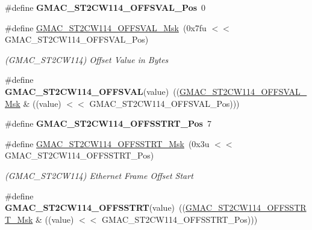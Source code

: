 \begin{DoxyCompactItemize}
\item 
\mbox{\label{group__SAME70__GMAC_ga6c2abe9d96e3e202f010911c71a17f2d}} 
\#define {\bfseries G\+M\+A\+C\+\_\+\+S\+T2\+C\+W114\+\_\+\+O\+F\+F\+S\+V\+A\+L\+\_\+\+Pos}~0
\item 
\mbox{\label{group__SAME70__GMAC_ga2ffa03caa370aef57a44a86255c453f7}} 
\#define \mbox{\hyperlink{group__SAME70__GMAC_ga2ffa03caa370aef57a44a86255c453f7}{G\+M\+A\+C\+\_\+\+S\+T2\+C\+W114\+\_\+\+O\+F\+F\+S\+V\+A\+L\+\_\+\+Msk}}~(0x7fu $<$$<$ G\+M\+A\+C\+\_\+\+S\+T2\+C\+W114\+\_\+\+O\+F\+F\+S\+V\+A\+L\+\_\+\+Pos)
\begin{DoxyCompactList}\small\item\em (G\+M\+A\+C\+\_\+\+S\+T2\+C\+W114) Offset Value in Bytes \end{DoxyCompactList}\item 
\mbox{\label{group__SAME70__GMAC_gabd4720e1e0ab74092611717ff3c27256}} 
\#define {\bfseries G\+M\+A\+C\+\_\+\+S\+T2\+C\+W114\+\_\+\+O\+F\+F\+S\+V\+AL}(value)~((\mbox{\hyperlink{group__SAMV71__GMAC_ga2ffa03caa370aef57a44a86255c453f7}{G\+M\+A\+C\+\_\+\+S\+T2\+C\+W114\+\_\+\+O\+F\+F\+S\+V\+A\+L\+\_\+\+Msk}} \& ((value) $<$$<$ G\+M\+A\+C\+\_\+\+S\+T2\+C\+W114\+\_\+\+O\+F\+F\+S\+V\+A\+L\+\_\+\+Pos)))
\item 
\mbox{\label{group__SAME70__GMAC_gad5eabe8a76317266e2fca53037591c58}} 
\#define {\bfseries G\+M\+A\+C\+\_\+\+S\+T2\+C\+W114\+\_\+\+O\+F\+F\+S\+S\+T\+R\+T\+\_\+\+Pos}~7
\item 
\mbox{\label{group__SAME70__GMAC_ga0003ad736105a544d6e773316c397157}} 
\#define \mbox{\hyperlink{group__SAME70__GMAC_ga0003ad736105a544d6e773316c397157}{G\+M\+A\+C\+\_\+\+S\+T2\+C\+W114\+\_\+\+O\+F\+F\+S\+S\+T\+R\+T\+\_\+\+Msk}}~(0x3u $<$$<$ G\+M\+A\+C\+\_\+\+S\+T2\+C\+W114\+\_\+\+O\+F\+F\+S\+S\+T\+R\+T\+\_\+\+Pos)
\begin{DoxyCompactList}\small\item\em (G\+M\+A\+C\+\_\+\+S\+T2\+C\+W114) Ethernet Frame Offset Start \end{DoxyCompactList}\item 
\mbox{\label{group__SAME70__GMAC_ga8d2bc9f65930306376b1ce22204a81e3}} 
\#define {\bfseries G\+M\+A\+C\+\_\+\+S\+T2\+C\+W114\+\_\+\+O\+F\+F\+S\+S\+T\+RT}(value)~((\mbox{\hyperlink{group__SAMV71__GMAC_ga0003ad736105a544d6e773316c397157}{G\+M\+A\+C\+\_\+\+S\+T2\+C\+W114\+\_\+\+O\+F\+F\+S\+S\+T\+R\+T\+\_\+\+Msk}} \& ((value) $<$$<$ G\+M\+A\+C\+\_\+\+S\+T2\+C\+W114\+\_\+\+O\+F\+F\+S\+S\+T\+R\+T\+\_\+\+Pos)))

\end{DoxyCompactItemize}

